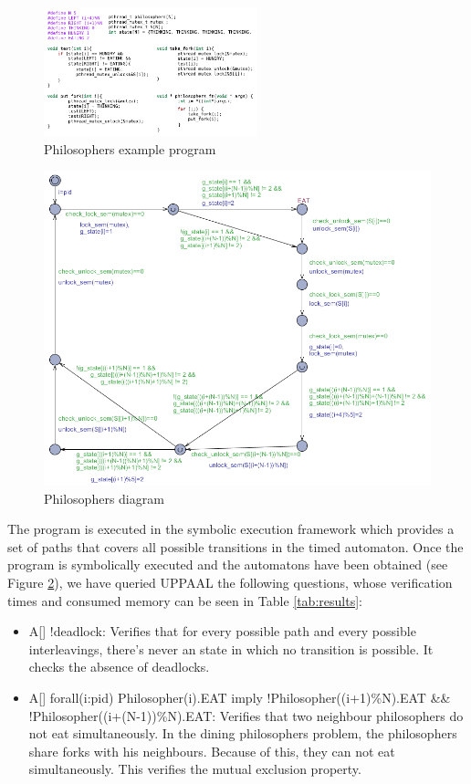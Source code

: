 \documentclass[conference]{IEEEtran}
\begin{document}
\begin{figure}[t!]
    \centering
    \includegraphics[width=0.55\textwidth]{media/philosophers.pdf}
    \caption{Philosophers example program}
    \label{fig:philosophers}
\end{figure}

\begin{figure}[t!]
\centering
\includegraphics[width=\columnwidth]{media/uppaal_filos.png}
\caption{Philosophers diagram}
\label{fig:uppaal_philo}
\end{figure}


The program is executed in the symbolic execution framework which provides a set of paths that covers all possible transitions in the timed automaton. Once the program is symbolically executed and the automatons have been obtained (see Figure \ref{fig:uppaal_philo}), we have queried UPPAAL the following questions, whose verification times and consumed memory can be seen in Table \ref{tab:results}:



\begin{itemize}
    \item A[] !deadlock: Verifies that for every possible path and every possible interleavings, there's never an state in which no transition is possible. It checks the absence of deadlocks. 
    \item A[] forall(i:pid) Philosopher(i).EAT imply !Philosopher((i+1)\%N).EAT \&\& !Philosopher((i+(N-1))\%N).EAT: Verifies that two neighbour philosophers do not eat simultaneously. In the dining philosophers problem, the philosophers share forks with his neighbours. Because of this, they can not eat simultaneously. This verifies the  mutual exclusion property. 
\end{itemize}
\end{document}
